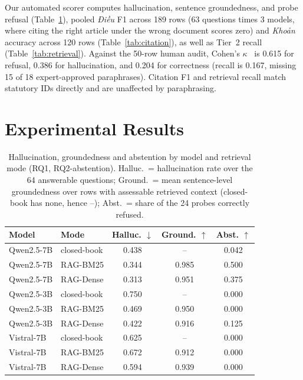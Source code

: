 \documentclass[conference,a4paper]{IEEEtran}
\begin{document}
Our automated scorer computes hallucination, sentence groundedness, and probe refusal (Table~\ref{tab:main}), pooled \emph{Điều} F1 across 189 rows (63 questions times 3 models, where citing the right article under the wrong document scores zero) and \emph{Khoản} accuracy across 120 rows (Table~\ref{tab:citation}), as well as Tier~2 recall (Table~\ref{tab:retrieval}). Against the 50-row human audit, Cohen's $\kappa$~\cite{cohen1960kappa} is 0.615 for refusal, 0.386 for hallucination, and 0.204 for correctness (recall is 0.167, missing 15 of 18 expert-approved paraphrases). Citation F1 and retrieval recall match statutory IDs directly and are unaffected by paraphrasing.

\section{Experimental Results}
\label{sec:results}

\begin{table}[t]
\centering
\caption{Hallucination, groundedness and abstention by model and retrieval mode (RQ1, RQ2-abstention). Halluc.\ = hallucination rate over the 64 answerable questions; Ground.\ = mean sentence-level groundedness over rows with assessable retrieved context (closed-book has none, hence --); Abst.\ = share of the 24 probes correctly refused.}
\label{tab:main}
\begin{tabular}{@{}llccc@{}}
\toprule
Model & Mode & Halluc. $\downarrow$ & Ground. $\uparrow$ & Abst. $\uparrow$ \\
\midrule
Qwen2.5-7B  & closed-book & 0.438 & --    & 0.042 \\
Qwen2.5-7B  & RAG-BM25    & 0.344 & 0.985 & 0.500 \\
Qwen2.5-7B  & RAG-Dense   & 0.313 & 0.951 & 0.375 \\
Qwen2.5-3B  & closed-book & 0.750 & --    & 0.000 \\
Qwen2.5-3B  & RAG-BM25    & 0.469 & 0.950 & 0.000 \\
Qwen2.5-3B  & RAG-Dense   & 0.422 & 0.916 & 0.125 \\
Vistral-7B  & closed-book & 0.625 & --    & 0.000 \\
Vistral-7B  & RAG-BM25    & 0.672 & 0.912 & 0.000 \\
Vistral-7B  & RAG-Dense   & 0.594 & 0.939 & 0.000 \\
\bottomrule
\end{tabular}
\end{table}
\end{document}
